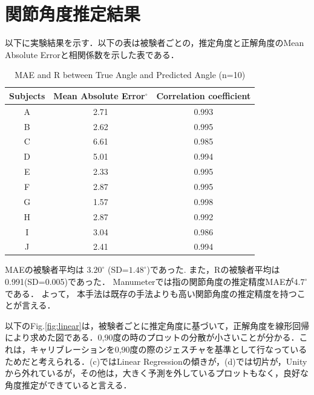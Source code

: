 \section{関節角度推定結果}


以下に実験結果を示す．以下の表は被験者ごとの，推定角度と正解角度のMean Absolute Errorと相関係数を示した表である．


\begin{table}[H]
  \caption{MAE and R between{}
True Angle and Predicted Angle (n=10)}
  \label{table:data_type}
  \centering
  \begin{tabular}{ccc}
    \hline
    Subjects  & Mean Absolute Error$^\circ$  & Correlation coefficient  \\
    \hline \hline
    A  & 2.71 & 0.993\\
    B  & 2.62 & 0.995\\
    C  & 6.61 & 0.985\\
    D  & 5.01 & 0.994\\
    E  & 2.33 & 0.995\\ 
    F  & 2.87 & 0.995\\
    G  & 1.57 & 0.998\\
    H  & 2.87 & 0.992\\
    I  & 3.04 & 0.986\\
    J  & 2.41 & 0.994\\
    \hline
  \end{tabular}
\end{table}

MAEの被験者平均は $3.20^\circ$ (SD=$1.48^\circ$)であった.
また，Rの被験者平均は0.991(SD=0.005)であった．
Manumeterでは指の関節角度の推定精度MAEが$4.7^\circ$である\cite{Friedman2014}．
よって， 本手法は既存の手法よりも高い関節角度の推定精度を持つことが言える．

以下のFig.\ref{fig:linear}は，被験者ごとに推定角度に基づいて，正解角度を線形回帰により求めた図である．0,90度の時のプロットの分散が小さいことが分かる．これは，キャリブレーションを0,90度の際のジェスチャを基準として行なっているためだと考えられる．(c)ではLinear Regressionの傾きが，(d)では切片が，Unityから外れているが，その他は，大きく予測を外しているプロットもなく，良好な角度推定ができていると言える．

